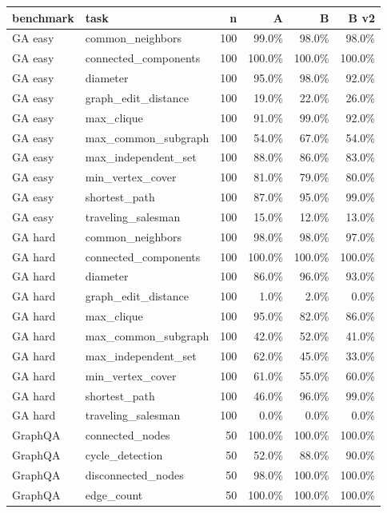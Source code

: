 \begin{tabular}{llrrrr}
\toprule
benchmark & task & n & A & B & B v2 \\
\midrule
GA easy & common\_neighbors & 100 & 99.0\% & 98.0\% & 98.0\% \\
GA easy & connected\_components & 100 & 100.0\% & 100.0\% & 100.0\% \\
GA easy & diameter & 100 & 95.0\% & 98.0\% & 92.0\% \\
GA easy & graph\_edit\_distance & 100 & 19.0\% & 22.0\% & 26.0\% \\
GA easy & max\_clique & 100 & 91.0\% & 99.0\% & 92.0\% \\
GA easy & max\_common\_subgraph & 100 & 54.0\% & 67.0\% & 54.0\% \\
GA easy & max\_independent\_set & 100 & 88.0\% & 86.0\% & 83.0\% \\
GA easy & min\_vertex\_cover & 100 & 81.0\% & 79.0\% & 80.0\% \\
GA easy & shortest\_path & 100 & 87.0\% & 95.0\% & 99.0\% \\
GA easy & traveling\_salesman & 100 & 15.0\% & 12.0\% & 13.0\% \\
GA hard & common\_neighbors & 100 & 98.0\% & 98.0\% & 97.0\% \\
GA hard & connected\_components & 100 & 100.0\% & 100.0\% & 100.0\% \\
GA hard & diameter & 100 & 86.0\% & 96.0\% & 93.0\% \\
GA hard & graph\_edit\_distance & 100 & 1.0\% & 2.0\% & 0.0\% \\
GA hard & max\_clique & 100 & 95.0\% & 82.0\% & 86.0\% \\
GA hard & max\_common\_subgraph & 100 & 42.0\% & 52.0\% & 41.0\% \\
GA hard & max\_independent\_set & 100 & 62.0\% & 45.0\% & 33.0\% \\
GA hard & min\_vertex\_cover & 100 & 61.0\% & 55.0\% & 60.0\% \\
GA hard & shortest\_path & 100 & 46.0\% & 96.0\% & 99.0\% \\
GA hard & traveling\_salesman & 100 & 0.0\% & 0.0\% & 0.0\% \\
GraphQA & connected\_nodes & 50 & 100.0\% & 100.0\% & 100.0\% \\
GraphQA & cycle\_detection & 50 & 52.0\% & 88.0\% & 90.0\% \\
GraphQA & disconnected\_nodes & 50 & 98.0\% & 100.0\% & 100.0\% \\
GraphQA & edge\_count & 50 & 100.0\% & 100.0\% & 100.0\% \\

\end{tabular}
